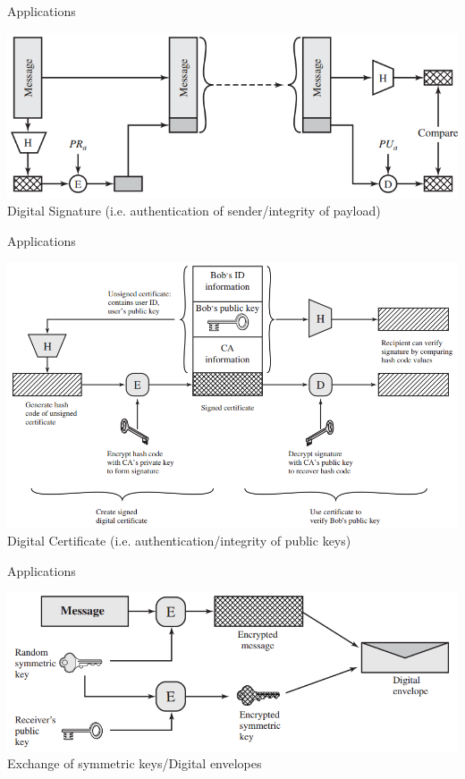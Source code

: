 \documentclass{beamer}
\begin{document}
\begin{frame}{Applications}
  \begin{center}
    \includegraphics[width=0.8\linewidth]{signature}\\
  Digital Signature (i.e. authentication of sender/integrity of payload)
  \end{center}
\end{frame}
 
\begin{frame}{Applications}
  \begin{center}
    \includegraphics[width=0.8\linewidth]{certificate}\\
  Digital Certificate (i.e. authentication/integrity of public keys)
  \end{center}
\end{frame}

\begin{frame}{Applications}
  \begin{center}
    \includegraphics[width=0.8\linewidth]{envelope}\\
  Exchange of symmetric keys/Digital envelopes
  \end{center}
\end{frame}
\end{document}
